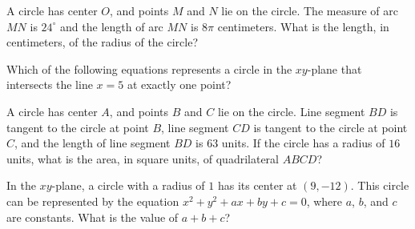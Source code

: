 \vspace{2em}

\noindent\markforreview
\vspace{1em}

A circle has center $O$, and points $M$ and $N$ lie on the circle. The measure of arc $MN$ is $24^\circ$ and the length of arc $MN$ is $8\pi$ centimeters. What is the length, in centimeters, of the radius of the circle?


\vspace{2em}

\noindent\markforreview
\vspace{1em}

Which of the following equations represents a circle in the $xy$-plane that intersects the line $x = 5$ at exactly one point?


\vspace{2em}

\noindent\markforreview
\vspace{1em}

A circle has center $A$, and points $B$ and $C$ lie on the circle. Line segment $BD$ is tangent to the circle at point $B$, line segment $CD$ is tangent to the circle at point $C$, and the length of line segment $BD$ is $63$ units. If the circle has a radius of $16$ units, what is the area, in square units, of quadrilateral $ABCD$?

\vspace{2em}

\noindent\markforreview
\vspace{1em}

In the $xy$-plane, a circle with a radius of $1$ has its center at $(9, -12)$. This circle can be represented by the equation $x^2 + y^2 + ax + by + c = 0$, where $a$, $b$, and $c$ are constants. What is the value of $a + b + c$?
